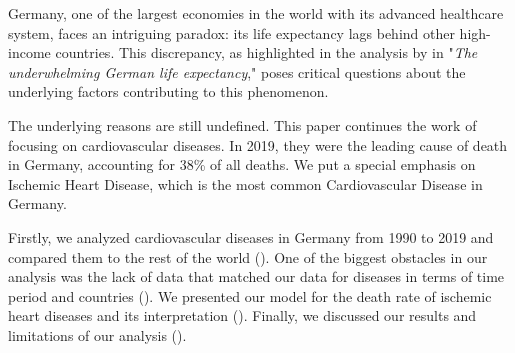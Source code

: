 
Germany, one of the largest economies in the world with its advanced healthcare 
system, faces an intriguing paradox: its life expectancy lags behind other 
high-income countries. This discrepancy, as highlighted in the analysis by 
\citet{Jasilionis2023} in "\textit{The underwhelming German life expectancy}," 
poses critical questions about the underlying factors contributing to this 
phenomenon.

The underlying reasons are still undefined. This paper continues the work of \citet{Jasilionis2023} focusing on cardiovascular diseases. In 2019, they were the leading cause of death in Germany, accounting for 38\% of all deaths. 
We put a special emphasis on Ischemic Heart Disease, which is the most common Cardiovascular Disease in Germany.


Firstly, we analyzed cardiovascular diseases in Germany from 1990 to 2019 and compared them to the rest of the world (). One of the biggest obstacles in our analysis was the lack of data that matched our data for diseases in terms of time period and countries (). We presented our model for the death rate of ischemic heart diseases and its interpretation (). Finally, we discussed our results and limitations of our analysis ().
